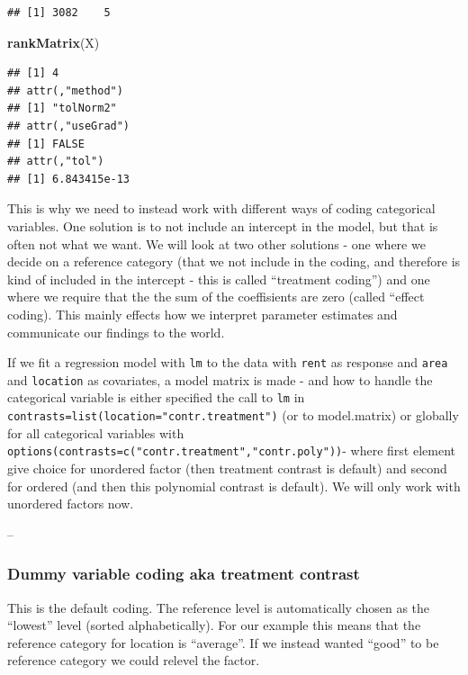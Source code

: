 \documentclass[
]{article}
\newenvironment{Shaded}{\begin{snugshade}}{\end{snugshade}}
\newcommand{\FunctionTok}[1]{\textcolor[rgb]{0.13,0.29,0.53}{\textbf{#1}}}
\newcommand{\NormalTok}[1]{#1}
\begin{document}
\begin{verbatim}
## [1] 3082    5
\end{verbatim}

\begin{Shaded}
\begin{Highlighting}[]
\FunctionTok{rankMatrix}\NormalTok{(X)}
\end{Highlighting}
\end{Shaded}

\begin{verbatim}
## [1] 4
## attr(,"method")
## [1] "tolNorm2"
## attr(,"useGrad")
## [1] FALSE
## attr(,"tol")
## [1] 6.843415e-13
\end{verbatim}

This is why we need to instead work with different ways of coding
categorical variables. One solution is to not include an intercept in
the model, but that is often not what we want. We will look at two other
solutions - one where we decide on a reference category (that we not
include in the coding, and therefore is kind of included in the
intercept - this is called ``treatment coding'') and one where we
require that the the sum of the coeffisients are zero (called ``effect
coding). This mainly effects how we interpret parameter estimates and
communicate our findings to the world.

If we fit a regression model with \texttt{lm} to the data with
\texttt{rent} as response and \texttt{area} and \texttt{location} as
covariates, a model matrix is made - and how to handle the categorical
variable is either specified the call to \texttt{lm} in
\texttt{contrasts=list(location="contr.treatment")} (or to model.matrix)
or globally for all categorical variables with
\texttt{options(contrasts=c("contr.treatment","contr.poly"))}- where
first element give choice for unordered factor (then treatment contrast
is default) and second for ordered (and then this polynomial contrast is
default). We will only work with unordered factors now.

--

\hypertarget{dummy-variable-coding-aka-treatment-contrast}{%
\subsubsection{Dummy variable coding aka treatment
contrast}\label{dummy-variable-coding-aka-treatment-contrast}}

This is the default coding. The reference level is automatically chosen
as the ``lowest'' level (sorted alphabetically). For our example this
means that the reference category for location is ``average''. If we
instead wanted ``good'' to be reference category we could relevel the
factor.
\end{document}
